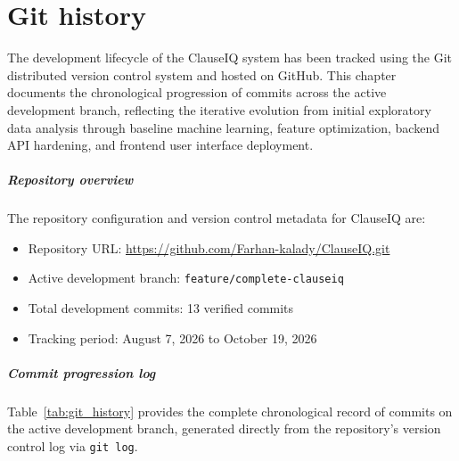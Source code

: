 \chapter{Git history}
\label{ch:git_history}

The development lifecycle of the ClauseIQ system has been tracked using the Git distributed version control system and hosted on GitHub. This chapter documents the chronological progression of commits across the active development branch, reflecting the iterative evolution from initial exploratory data analysis through baseline machine learning, feature optimization, backend API hardening, and frontend user interface deployment.

\paragraph*{Repository overview}
The repository configuration and version control metadata for ClauseIQ are:
\begin{itemize}
    \item Repository URL: \url{https://github.com/Farhan-kalady/ClauseIQ.git}
    \item Active development branch: \texttt{feature/complete-clauseiq}
    \item Total development commits: 13 verified commits
    \item Tracking period: August 7, 2026 to October 19, 2026
\end{itemize}

\paragraph*{Commit progression log}
Table~\ref{tab:git_history} provides the complete chronological record of commits on the active development branch, generated directly from the repository's version control log via \texttt{git log}.




